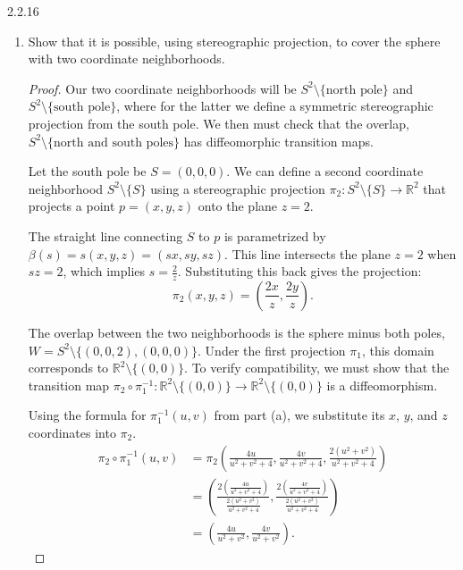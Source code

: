 \documentclass[11pt]{article}
\begin{document}
\begin{problem}{2.2.16}
\begin{enumerate}[label=(\alph*)]
\begin{proof}
\begin{align}
              & = \left( \frac{4u}{u^2 + v^2 + 4}, \frac{4v}{u^2 + v^2 + 4}, \frac{2(u^2 + v^2)}{u^2 + v^2 + 4} \right),
            \end{align}
            as desired.
          \end{proof}
		\item Show that it is possible, using stereographic projection, to cover the sphere with two coordinate neighborhoods.
          \begin{proof}
            Our two coordinate neighborhoods will be \( S^2 \setminus \{\text{north pole}\} \) and \( S^2 \setminus \{\text{south pole}\} \), where for the latter we define a symmetric stereographic projection from the south pole.
            We then must check that the overlap, \( S^2 \setminus \{\text{north and south poles}\} \) has diffeomorphic transition maps.

            Let the south pole be \( S = (0,0,0) \).
            We can define a second coordinate neighborhood \( S^2 \setminus \{S\} \) using a stereographic projection \( \pi_2: S^2 \setminus \{S\} \rightarrow \mathbb{R}^2 \) that projects a point \( p = (x,y,z) \) onto the plane \( z = 2 \).

            The straight line connecting \( S \) to \( p \) is parametrized by \( \beta(s) = s(x,y,z) = (sx, sy, sz) \).
            This line intersects the plane \( z = 2 \) when \( sz = 2 \), which implies \( s = \frac{2}{z} \).
            Substituting this back gives the projection:
            \begin{equation}
                \pi_2(x,y,z) = \left( \frac{2x}{z}, \frac{2y}{z} \right).
            \end{equation}

            The overlap between the two neighborhoods is the sphere minus both poles, \( W = S^2 \setminus \{(0,0,2), (0,0,0)\} \).
            Under the first projection \( \pi_1 \), this domain corresponds to \( \mathbb{R}^2 \setminus \{(0,0)\} \).
            To verify compatibility, we must show that the transition map \( \pi_2 \circ \pi_1^{-1}: \mathbb{R}^2 \setminus \{(0,0)\} \rightarrow \mathbb{R}^2 \setminus \{(0,0)\} \) is a diffeomorphism.

            Using the formula for \( \pi_1^{-1}(u,v) \) from part (a), we substitute its \( x \), \( y \), and \( z \) coordinates into \( \pi_2 \).
            \begin{align}
                \pi_2 \circ \pi_1^{-1}(u,v) &= \pi_2\left( \frac{4u}{u^2 + v^2 + 4}, \frac{4v}{u^2 + v^2 + 4}, \frac{2(u^2 + v^2)}{u^2 + v^2 + 4} \right) \\
                &= \left( \frac{2 \left( \frac{4u}{u^2 + v^2 + 4} \right)}{\frac{2(u^2 + v^2)}{u^2 + v^2 + 4}}, \frac{2 \left( \frac{4v}{u^2 + v^2 + 4} \right)}{\frac{2(u^2 + v^2)}{u^2 + v^2 + 4}} \right) \\
                &= \left( \frac{4u}{u^2 + v^2}, \frac{4v}{u^2 + v^2} \right).
            \end{align}


\end{proof}
\end{enumerate}
\end{problem}
\end{document}
